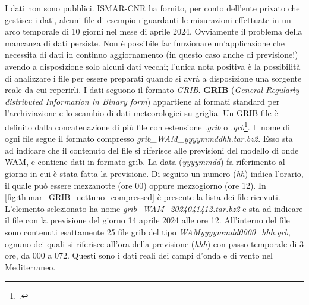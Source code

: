 \documentclass[./main.tex]{subfiles}
\begin{document}
I dati non sono pubblici. ISMAR-CNR ha fornito, per conto dell'ente privato che gestisce i dati, alcuni file di esempio riguardanti le misurazioni effettuate in un arco temporale di 10 giorni nel mese di aprile 2024. Ovviamente il problema della mancanza di dati persiste. Non è possibile far funzionare un'applicazione che necessita di dati in continuo aggiornamento (in questo caso anche di previsione!) avendo a disposizione solo alcuni dati vecchi; l'unica nota positiva è la possibilità di analizzare i file per essere preparati quando si avrà a disposizione una sorgente reale da cui reperirli. I dati seguono il formato \textit{GRIB}. \textbf{GRIB} (\textit{General Regularly distributed Information in Binary form}) appartiene ai formati standard per l'archiviazione e lo scambio di dati meteorologici su griglia. Un GRIB file è definito dalla concatenazione di più file con estensione \textit{.grib} o \textit{.grb}\footcite[\url{https://confluence.ecmwf.int/display/CKB/What+are+GRIB+files+and+how+can+I+read+them}]{website-ecmwf-confluence}. Il nome di ogni file segue il formato compresso \textit{grib\_WAM\_yyyymmddhh.tar.bz2}. Esso sta ad indicare che il contenuto del file si riferisce alle previsioni del modello di onde WAM, e contiene dati in formato grib. La data (\textit{yyyymmdd}) fa riferimento al giorno in cui è stata fatta la previsione. Di seguito un numero (\textit{hh}) indica l'orario, il quale può essere mezzanotte (ore 00) oppure mezzogiorno (ore 12). In \autoref{fig:thunar_GRIB_nettuno_compressed} è presente la lista dei file ricevuti. L'elemento selezionato ha nome \textit{grib\_WAM\_2024041412.tar.bz2} e sta ad indicare il file con la previsione del giorno 14 aprile 2024 alle ore 12. All'interno del file sono contenuti esattamente 25 file grib del tipo \textit{WAMyyyymmdd0000\_hhh.grb}, ognuno dei quali si riferisce all'ora della previsione (\textit{hhh}) con passo temporale di 3 ore, da 000 a 072. Questi sono i dati reali dei campi d'onda e di vento nel Mediterraneo. 
\end{document}
